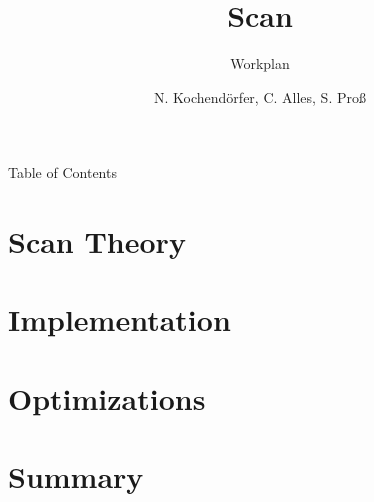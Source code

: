 \documentclass[compress, 11pt]{beamer}
\title[Scan]{Scan}
\subtitle{Workplan}
\author{N. Kochendörfer, C. Alles, S. Proß}
\begin{document}
\frame{\titlepage}

\begin{frame}{Table of Contents}
    \tableofcontents
    
    \note{
    }
\end{frame}

\section{Scan Theory} %


\section{Implementation} %



\section{Optimizations} %
 
 




\section{Summary}

\end{document}
